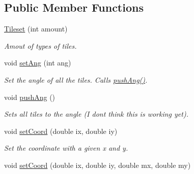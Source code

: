 \subsection*{Public Member Functions}
\begin{DoxyCompactItemize}
\item 
\hyperlink{classTileset_a438bd441809f8e9508a6052580cfdc8b}{Tileset} (int amount)\hypertarget{classTileset_a438bd441809f8e9508a6052580cfdc8b}{}\label{classTileset_a438bd441809f8e9508a6052580cfdc8b}

\begin{DoxyCompactList}\small\item\em Amout of types of tiles. \end{DoxyCompactList}\item 
void \hyperlink{classTileset_a1f751647f22bce36f58fd738b97a67bd}{set\+Ang} (int ang)\hypertarget{classTileset_a1f751647f22bce36f58fd738b97a67bd}{}\label{classTileset_a1f751647f22bce36f58fd738b97a67bd}

\begin{DoxyCompactList}\small\item\em Set the angle of all the tiles. Calls \hyperlink{classTileset_adf1b34b6c742198c3d05b620ed3c25e1}{push\+Ang()}. \end{DoxyCompactList}\item 
void \hyperlink{classTileset_adf1b34b6c742198c3d05b620ed3c25e1}{push\+Ang} ()\hypertarget{classTileset_adf1b34b6c742198c3d05b620ed3c25e1}{}\label{classTileset_adf1b34b6c742198c3d05b620ed3c25e1}

\begin{DoxyCompactList}\small\item\em Sets all tiles to the angle (I don\textquotesingle{}t think this is working yet). \end{DoxyCompactList}\item 
void \hyperlink{classTileset_acc04d7d0538f4ef33cb64d638d380c96}{set\+Coord} (double ix, double iy)\hypertarget{classTileset_acc04d7d0538f4ef33cb64d638d380c96}{}\label{classTileset_acc04d7d0538f4ef33cb64d638d380c96}

\begin{DoxyCompactList}\small\item\em Set the coordinate with a given x and y. \end{DoxyCompactList}\item 
void \hyperlink{classTileset_a34cf0bb5a6326a6dbcbe3f352f3ea7a5}{set\+Coord} (double ix, double iy, double mx, double my)\hypertarget{classTileset_a34cf0bb5a6326a6dbcbe3f352f3ea7a5}{}\label{classTileset_a34cf0bb5a6326a6dbcbe3f352f3ea7a5}


\end{DoxyCompactItemize}
